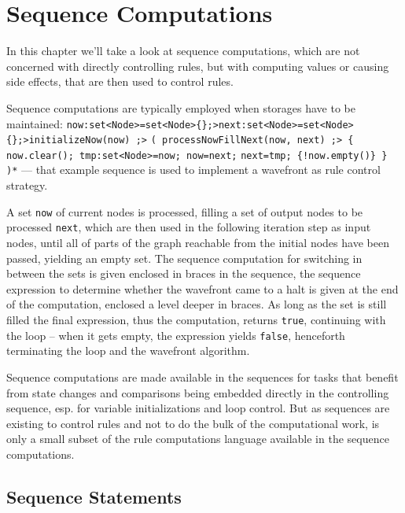 
\chapter{Sequence Computations}\label{seqcomp}

In this chapter we'll take a look at sequence computations, which are not concerned with directly controlling rules, but with computing values or causing side effects, that are then used to control rules.

\begin{example}
Sequence computations are typically employed when storages have to be maintained:
\verb#now:set<Node>=set<Node>{};>next:set<Node>=set<Node>{};>initializeNow(now) ;>#
\verb#( processNowFillNext(now, next) ;> { now.clear(); tmp:set<Node>=now; now=next;#
\verb#next=tmp; {!now.empty()} } )*#
--- that example sequence is used to implement a wavefront as rule control strategy.

A set \texttt{now} of current nodes is processed, filling a set of output nodes to be processed \texttt{next}, which are then used in the following iteration step as input nodes, until all of parts of the graph reachable from the initial nodes have been passed, yielding an empty set.
The sequence computation for switching in between the sets is given enclosed in braces in the sequence, 
the sequence expression to determine whether the wavefront came to a halt is given at the end of the computation,
enclosed a level deeper in braces.
As long as the set is still filled the final expression, thus the computation, returns \texttt{true}, continuing with the loop -- when it gets empty, the expression yields \texttt{false}, henceforth terminating the loop and the wavefront algorithm.

Sequence computations are made available in the sequences for tasks that benefit from state changes and comparisons being embedded directly in the controlling sequence, esp. for variable initializations and loop control.
But as sequences are existing to control rules and not to do the bulk of the computational work,
is only a small subset of the rule computations language available in the sequence computations. 
\end{example}


\section{Sequence Statements} \label{sec:seqcomp}

